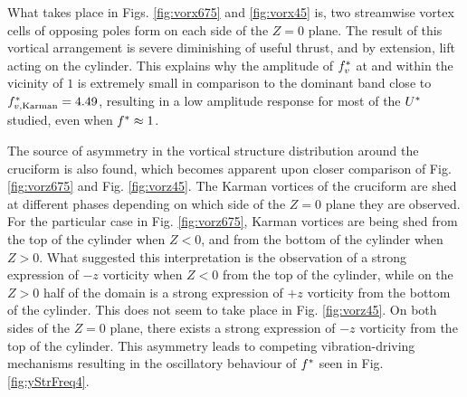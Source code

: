 \documentclass[oneside]{utmthesis}
\begin{document}
What takes place in Figs. \ref{fig:vorx675} and \ref{fig:vorx45} is, two streamwise vortex cells of opposing poles form on each side of the $Z = 0$ plane. The result of this vortical arrangement is severe diminishing of useful thrust, and by extension, lift acting on the cylinder. This explains why the amplitude of $f^{*}_{v}$ at and within the vicinity of $1$ is extremely small in comparison to the dominant band close to $f^{*}_{v,\text{Karman}} = 4.49$, resulting in a low amplitude response for most of the $U^{*}$ studied, even when $f^{*} \approx 1$.

The source of asymmetry in the vortical structure distribution around the cruciform is also found, which becomes apparent upon closer comparison of Fig. \ref{fig:vorz675} and Fig. \ref{fig:vorz45}. The Karman vortices of the \angfo{} cruciform are shed at different phases depending on which side of the $Z = 0$ plane they are observed. For the particular case in Fig. \ref{fig:vorz675}, Karman vortices are being shed from the top of the cylinder when $Z < 0$, and from the bottom of the cylinder when $Z > 0$. What suggested this interpretation is the observation of a strong expression of $-z$ vorticity when $Z < 0$ from the top of the cylinder, while on the $Z > 0$ half of the domain is a strong expression of $+z$ vorticity from the bottom of the cylinder. This does not seem to take place in Fig. \ref{fig:vorz45}. On both sides of the $Z = 0$ plane, there exists a strong expression of $-z$ vorticity from the top of the cylinder. This asymmetry leads to competing vibration-driving mechanisms resulting in the oscillatory behaviour of $f^{*}$ seen in Fig. \ref{fig:yStrFreq4}.
\end{document}
